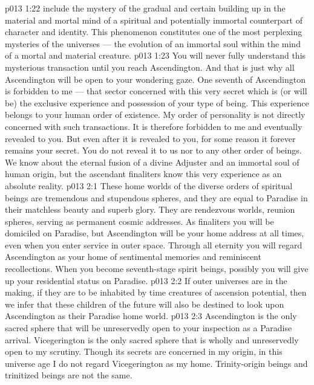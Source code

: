 \vs p013 1:22 \pc {} include the mystery of the gradual and certain building up in the material and mortal mind of a spiritual and potentially immortal counterpart of character and identity. This phenomenon constitutes one of the most perplexing mysteries of the universes --- the evolution of an immortal soul within the mind of a mortal and material creature.
\vs p013 1:23 You will never fully understand this mysterious transaction until you reach Ascendington. And that is just why all Ascendington will be open to your wondering gaze. One seventh of Ascendington is forbidden to me --- that sector concerned with this very secret which is (or will be) the exclusive experience and possession of your type of being. This experience belongs to your human order of existence. My order of personality is not directly concerned with such transactions. It is therefore forbidden to me and eventually revealed to you. But even after it is revealed to you, for some reason it forever remains your secret. You do not reveal it to us nor to any other order of beings. We know about the eternal fusion of a divine Adjuster and an immortal soul of human origin, but the ascendant finaliters know this very experience as an absolute reality.
\vs p013 2:1 These home worlds of the diverse orders of spiritual beings are tremendous and stupendous spheres, and they are equal to Paradise in their matchless beauty and superb glory. They are rendezvous worlds, reunion spheres, serving as permanent cosmic addresses. As finaliters you will be domiciled on Paradise, but Ascendington will be your home address at all times, even when you enter service in outer space. Through all eternity you will regard Ascendington as your home of sentimental memories and reminiscent recollections. When you become seventh\hyp{}stage spirit beings, possibly you will give up your residential status on Paradise.
\vs p013 2:2 If outer universes are in the making, if they are to be inhabited by time creatures of ascension potential, then we infer that these children of the future will also be destined to look upon Ascendington as their Paradise home world.
\vs p013 2:3 \pc Ascendington is the only sacred sphere that will be unreservedly open to your inspection as a Paradise arrival. Vicegerington is the only sacred sphere that is wholly and unreservedly open to my scrutiny. Though its secrets are concerned in my origin, in this universe age I do not regard Vicegerington as my home. Trinity\hyp{}origin beings and trinitized beings are not the same.
